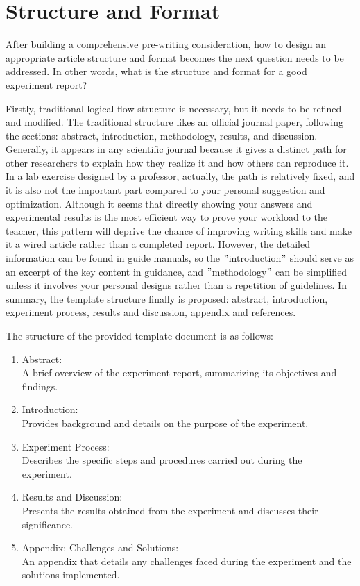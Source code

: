 \documentclass[12pt]{article}
\begin{document}
\section{Structure and Format}

After building a comprehensive pre-writing consideration, how to design an appropriate article structure and format becomes the next question needs to be addressed.
In other words, what is the structure and format for a good experiment report?

Firstly, traditional logical flow structure is necessary, but it needs to be refined and modified.
The traditional structure likes an official journal paper, following the sections: abstract, introduction, methodology, results, and discussion.
Generally, it appears in any scientific journal because it gives a distinct path for other researchers to explain how they realize it and how others can reproduce it.
In a lab exercise designed by a professor, actually, the path is relatively fixed, and it is also not the important part compared to your personal suggestion and optimization.
Although it seems that directly showing your answers and experimental results is the most efficient way to prove your workload to the teacher, this pattern will deprive the chance of improving writing skills and make it a wired article rather than a completed report.
However, the detailed information can be found in guide manuals, so the \("\)introduction\("\) should serve as an excerpt of the key content in guidance, and \("\)methodology\("\) can be simplified unless it involves your personal designs rather than a repetition of guidelines.
In summary, the template structure finally is proposed: abstract, introduction, experiment process, results and discussion, appendix and references.


The structure of the provided template document is as follows:

\begin{enumerate}
    \item Abstract: \\A brief overview of the experiment report, summarizing its objectives and findings.
    \item Introduction: \\Provides background and details on the purpose of the experiment.
    \item Experiment Process: \\Describes the specific steps and procedures carried out during the experiment.
    \item Results and Discussion: \\Presents the results obtained from the experiment and discusses their significance.
    \item Appendix: Challenges and Solutions: \\An appendix that details any challenges faced during the experiment and the solutions implemented.
\end{enumerate}
\end{document}
